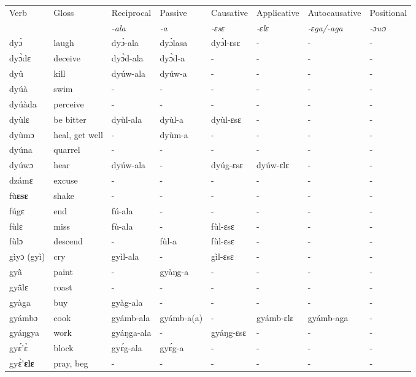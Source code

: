 \begin{sidewaystable}
\begin{tabular}{llllllll}
 \lsptoprule
 Verb & Gloss & Reciprocal & Passive  & Causative  & Applicative   & Autocausative & Positional   \\
  &    & {\itshape -ala} & {\itshape -a} & {\itshape -ɛsɛ} & {\itshape -ɛlɛ} & {\itshape -ɛga/-aga}  & {\itshape -ɔwɔ}  \\
\midrule
dyɔ̀ & laugh & dyɔ̀-ala & dyɔ̀lasa & dyɔ̀l-ɛsɛ & - & - & - \\
dyɔ̀dɛ & deceive & dyɔ̀d-ala & dyɔ̀d-a & - & - & - & - \\
dyû & kill & dyúw-ala & dyúw-a & - & - & - & - \\
dyúà & swim & - & - & - & - & - & - \\
dyúàda & perceive & - & - & - &  - & - & - \\
dyùlɛ & be bitter & dyùl-ala & dyùl-a & dyùl-ɛsɛ & - & - & - \\
dyùmɔ & heal, get well & - & dyùm-a & - & - & - & - \\
dyúna & quarrel & - & - & - & - & -  & - \\
dyúwɔ & hear & dyúw-ala & - & dyúg-ɛsɛ & dyúw-ɛlɛ & - & - \\
dzámɛ & excuse & - & - & - & -  & - & - \\ 
fù{\bfseries ɛsɛ} & shake & - & - &  - & - & - & - \\
 fúgɛ & end & fú-ala & - & - & - & - & - \\
fùlɛ & miss & fù-ala & - & fùl-ɛsɛ & - & - & - \\
fùlɔ & descend & - &  fùl-a & fùl-ɛsɛ & - & - & - \\
gìyɔ (gyì) & cry & gyìl-ala & - & gìl-ɛsɛ & - & - & - \\
gyã̀ & paint & - & gyàŋg-a & - & - & - & - \\
gyã̂lɛ & roast & - & - & - & - & - & - \\
 gyàga & buy & gyàg-ala & - & - & - & - & - \\
gyámbɔ & cook & gyámb-ala & gyámb-a(a) & - & gyámb-ɛlɛ & gyámb-aga & - \\
gyáŋgya & work & gyáŋga-ala  & - & gyáŋg-ɛsɛ & - & - & - \\
gyɛ́'ɛ̀ & block & gyɛ́g-ala & gyɛ́g-a & - & - & - & - \\
gyɛ̀'{\bfseries ɛlɛ} & pray, beg & - & - & - & - & - & - \\
\midrule\end{tabular}\end{sidewaystable}

